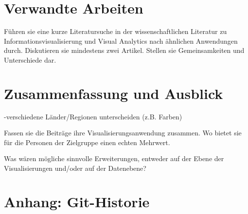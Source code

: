 \documentclass[usegeometry=true]{scrartcl}
\begin{document}
\section{Verwandte Arbeiten}


Führen sie eine kurze Literatursuche in der wissenschaftlichen Literatur zu Informationsvisualisierung und Visual Analytics nach ähnlichen Anwendungen durch. Diskutieren sie mindestens zwei Artikel. Stellen sie Gemeinsamkeiten und Unterschiede dar.

\section{Zusammenfassung und Ausblick}

-verschiedene Länder/Regionen unterscheiden (z.B. Farben)

Fassen sie die Beiträge ihre Visualisierungsanwendung zusammen. Wo bietet sie für die Personen der Zielgruppe einen echten Mehrwert.

Was wären mögliche sinnvolle Erweiterungen, entweder auf der Ebene der Visualisierungen und/oder auf der Datenebene?

\section*{Anhang: Git-Historie}

\printbibliography
\end{document}
